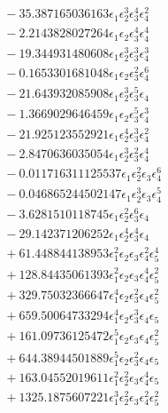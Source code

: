 \documentclass[10pt]{article}
\begin{document}
\begin{align*}
&{}  - 35.387165036163 \epsilon_{1} \epsilon_{2}^{3} \epsilon_{3}^{4} \epsilon_{4}^{2} \\
&{}  - 2.2143828027264 \epsilon_{1} \epsilon_{2} \epsilon_{3}^{4} \epsilon_{4}^{4} \\
&{}  - 19.344931480608 \epsilon_{1} \epsilon_{2}^{3} \epsilon_{3}^{3} \epsilon_{4}^{3} \\
&{}  - 0.1653301681048 \epsilon_{1} \epsilon_{2} \epsilon_{3}^{2} \epsilon_{4}^{6} \\
&{}  - 21.643932085908 \epsilon_{1} \epsilon_{2}^{3} \epsilon_{3}^{5} \epsilon_{4} \\
&{}  - 1.3669029646459 \epsilon_{1} \epsilon_{2} \epsilon_{3}^{5} \epsilon_{4}^{3} \\
&{}  - 21.925123552921 \epsilon_{1} \epsilon_{2}^{4} \epsilon_{3}^{3} \epsilon_{4}^{2} \\
&{}  - 2.8470636035054 \epsilon_{1} \epsilon_{2}^{3} \epsilon_{3}^{2} \epsilon_{4}^{4} \\
&{}  - 0.011716311125537 \epsilon_{1} \epsilon_{2}^{2} \epsilon_{3} \epsilon_{4}^{6} \\
&{}  - 0.046865244502147 \epsilon_{1} \epsilon_{2}^{3} \epsilon_{3} \epsilon_{4}^{5} \\
&{}  - 3.6281510118745 \epsilon_{1} \epsilon_{2}^{2} \epsilon_{3}^{6} \epsilon_{4} \\
&{}  - 29.142371206252 \epsilon_{1} \epsilon_{2}^{4} \epsilon_{3}^{4} \epsilon_{4} \\
&{}  + 61.448844138953 \epsilon_{1}^{2} \epsilon_{2} \epsilon_{3} \epsilon_{4}^{2} \epsilon_{5}^{4} \\
&{}  + 128.84435061393 \epsilon_{1}^{2} \epsilon_{2} \epsilon_{3} \epsilon_{4}^{4} \epsilon_{5}^{2} \\
&{}  + 329.75032366647 \epsilon_{1}^{4} \epsilon_{2} \epsilon_{3}^{2} \epsilon_{4} \epsilon_{5}^{2} \\
&{}  + 659.50064733294 \epsilon_{1}^{4} \epsilon_{2} \epsilon_{3}^{3} \epsilon_{4} \epsilon_{5} \\
&{}  + 161.09736125472 \epsilon_{1}^{5} \epsilon_{2} \epsilon_{3} \epsilon_{4} \epsilon_{5}^{2} \\
&{}  + 644.38944501889 \epsilon_{1}^{5} \epsilon_{2} \epsilon_{3}^{2} \epsilon_{4} \epsilon_{5} \\
&{}  + 163.04552019611 \epsilon_{1}^{2} \epsilon_{2}^{2} \epsilon_{3} \epsilon_{4}^{4} \epsilon_{5} \\
&{}  + 1325.1875607221 \epsilon_{1}^{3} \epsilon_{2}^{2} \epsilon_{3} \epsilon_{4}^{2} \epsilon_{5}^{2} \\

\end{align*}
\end{document}
